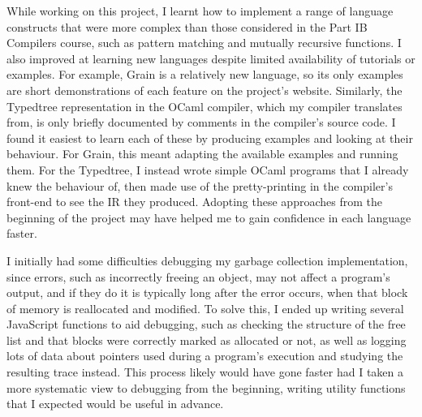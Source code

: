 While working on this project, I learnt how to implement a range of language constructs that were more complex than those considered in the Part IB Compilers course, such as pattern matching and mutually recursive functions.
%
I also improved at learning new languages despite limited availability of tutorials or examples. For example, Grain is a relatively new language, so its only examples are short demonstrations of each feature on the project's website. Similarly, the Typedtree representation in the OCaml compiler, which my compiler translates from, is only briefly documented by comments in the compiler's source code. I found it easiest to learn each of these by producing examples and looking at their behaviour. For Grain, this meant adapting the available examples and running them. For the Typedtree, I instead wrote simple OCaml programs that I already knew the behaviour of, then made use of the pretty-printing in the compiler's front-end to see the IR they produced. Adopting these approaches from the beginning of the project may have helped me to gain confidence in each language faster.

I initially had some difficulties debugging my garbage collection implementation, since errors, such as incorrectly freeing an object, may not affect a program's output, and if they do it is typically long after the error occurs, when that block of memory is reallocated and modified. To solve this, I ended up writing several JavaScript functions to aid debugging, such as checking the structure of the free list and that blocks were correctly marked as allocated or not, as well as logging lots of data about pointers used during a program's execution and studying the resulting trace instead. This process likely would have gone faster had I taken a more systematic view to debugging from the beginning, writing utility functions that I expected would be useful in advance.


